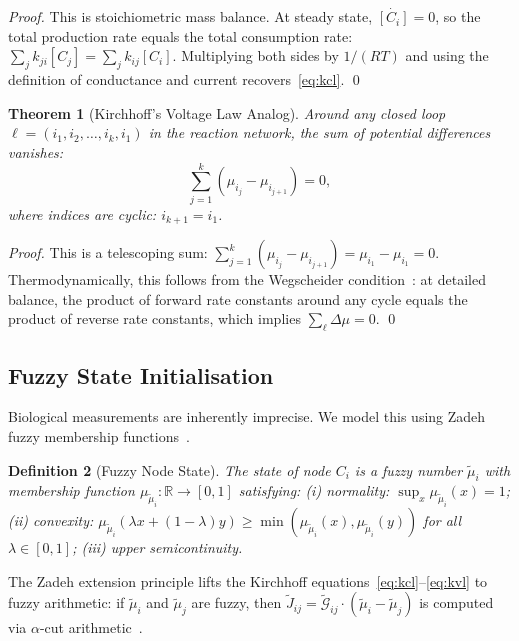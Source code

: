 \documentclass[11pt,twocolumn,a4paper]{article}
\newtheorem{theorem}{Theorem}[section]
\newtheorem{definition}[theorem]{Definition}
\newcommand{\R}{\mathbb{R}}
\newcommand{\Gcond}{\mathcal{G}}
\begin{document}
\begin{proof}
This is stoichiometric mass balance.  At steady state,
$\dot{[C_i]} = 0$, so the total production rate equals the total
consumption rate:
$\sum_j k_{ji}[C_j] = \sum_j k_{ij}[C_i]$.  Multiplying both sides
by $1/(RT)$ and using the definition of conductance and current
recovers~\eqref{eq:kcl}.  \qed
\end{proof}

\begin{theorem}[Kirchhoff's Voltage Law Analog]
\label{thm:kvl}
Around any closed loop $\ell = (i_1, i_2, \ldots, i_k, i_1)$ in the
reaction network, the sum of potential differences vanishes:
\begin{equation}
  \sum_{j=1}^{k} (\mu_{i_j} - \mu_{i_{j+1}}) = 0,
  \label{eq:kvl}
\end{equation}
where indices are cyclic: $i_{k+1} = i_1$.
\end{theorem}

\begin{proof}
This is a telescoping sum:
$\sum_{j=1}^{k}(\mu_{i_j} - \mu_{i_{j+1}}) = \mu_{i_1} - \mu_{i_1}
= 0$.  Thermodynamically, this follows from the Wegscheider
condition~\citep{wegscheider1901}: at detailed balance, the product of
forward rate constants around any cycle equals the product of reverse
rate constants, which implies $\sum_\ell \Delta\mu = 0$.  \qed
\end{proof}

\subsection{Fuzzy State Initialisation}

Biological measurements are inherently imprecise.  We model this using
Zadeh fuzzy membership functions~\citep{zadeh1965,zadeh1975}.

\begin{definition}[Fuzzy Node State]
\label{def:fuzzy}
The state of node $C_i$ is a fuzzy number $\tilde{\mu}_i$ with
membership function $\mu_{\tilde{\mu}_i} : \R \to [0,1]$ satisfying:
(i) normality: $\sup_x \mu_{\tilde{\mu}_i}(x) = 1$;
(ii) convexity: $\mu_{\tilde{\mu}_i}(\lambda x + (1-\lambda)y) \geq
\min(\mu_{\tilde{\mu}_i}(x), \mu_{\tilde{\mu}_i}(y))$ for all
$\lambda \in [0,1]$;
(iii) upper semicontinuity.
\end{definition}

The Zadeh extension principle lifts the Kirchhoff
equations~\eqref{eq:kcl}--\eqref{eq:kvl} to fuzzy arithmetic: if
$\tilde{\mu}_i$ and $\tilde{\mu}_j$ are fuzzy, then
$\tilde{J}_{ij} = \tilde{\Gcond}_{ij} \cdot (\tilde{\mu}_i -
\tilde{\mu}_j)$ is computed via $\alpha$-cut
arithmetic~\citep{zadeh1975}.
\end{document}
